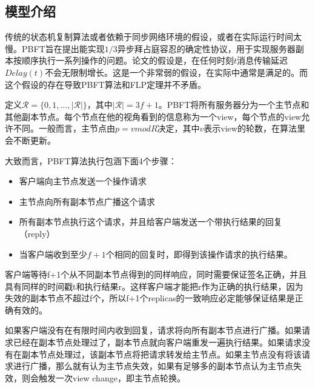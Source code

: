 \subsection{模型介绍}
传统的状态机复制算法或者依赖于同步网络环境的假设，或者在实际运行时间太慢。PBFT旨在提出能实现$1/3$异步拜占庭容忍的确定性协议，用于实现服务器副本按顺序执行一系列操作的问题。论文的假设是，在任何时刻$t$消息传输延迟$Delay(t)$不会无限制增长。这是一个非常弱的假设，在实际中通常是满足的。而这个假设的存在导致PBFT算法和FLP定理并不矛盾。

定义$\mathcal{R}=\{0,1,...,|\mathcal{R}|\}$，其中$|\mathcal{R}|=3f+1$。PBFT将所有服务器分为一个主节点和其他副本节点。每个节点在他的视角看到的信息称为一个view，每个节点的view允许不同。一般而言，主节点由$p=v mod R$决定，其中$v$表示view的轮数，在算法里会不断更新。

大致而言，PBFT算法执行包涵下面4个步骤：
\begin{itemize}
	\item 客户端向主节点发送一个操作请求
    \item 主节点向所有副本节点广播这个请求
    \item 所有副本节点执行这个请求，并且给客户端发送一个带执行结果的回复（reply）
    \item 当客户端收到至少$f+1$个相同的回复时，即得到该操作请求的执行结果。
\end{itemize}

客户端等待f+1个从不同副本节点得到的同样响应，同时需要保证签名正确，并且具有同样的时间戳t和执行结果r。这样客户端才能把r作为正确的执行结果，因为失效的副本节点不超过f个，所以f+1个replicas的一致响应必定能够保证结果是正确有效的。

如果客户端没有在有限时间内收到回复，请求将向所有副本节点进行广播。如果请求已经在副本节点处理过了，副本节点就向客户端重发一遍执行结果。如果请求没有在副本节点处理过，该副本节点将把请求转发给主节点。如果主节点没有将该请求进行广播，那么就有认为主节点失效，如果有足够多的副本节点认为主节点失效，则会触发一次view change，即主节点轮换。

